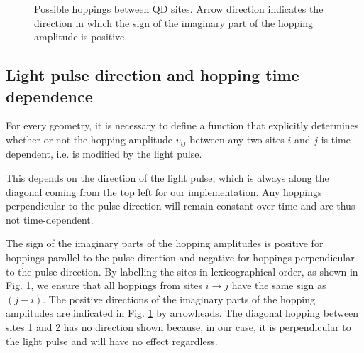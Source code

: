\begin{figure}[!hbt]
\begin{minipage}[b]{.48\textwidth}
    \caption{Possible hoppings between QD sites. Arrow direction indicates the direction in which the sign of the imaginary part of the hopping amplitude is positive.}
    \label{fig:qd_hoppings}
    \end{minipage}
\end{figure}

 \subsection{Light pulse direction and hopping time dependence}
For every geometry, it is necessary to define a function that explicitly determines whether or not the hopping amplitude $v_{ij}$ between any two sites $i$ and $j$ is time-dependent, i.e. is modified by the light pulse.
\medskip

This depends on the direction of the light pulse, which is always along the diagonal coming from the top left for our implementation. Any hoppings perpendicular to the pulse direction will remain constant over time and are thus not time-dependent.
\medskip

The sign of the imaginary parts of the hopping amplitudes is positive for hoppings parallel to the pulse direction and negative for hoppings perpendicular to the pulse direction. By labelling the sites in lexicographical order, as shown in Fig. \ref{fig:qd_hoppings}, we ensure that all hoppings from sites $i\to j$ have the same sign as $(j-i)$. The positive directions of the imaginary parts of the hopping amplitudes are indicated in Fig. \ref{fig:qd_hoppings} by arrowheads. The diagonal hopping between sites 1 and 2 has no direction shown because, in our case, it is perpendicular to the light pulse and will have no effect regardless.

